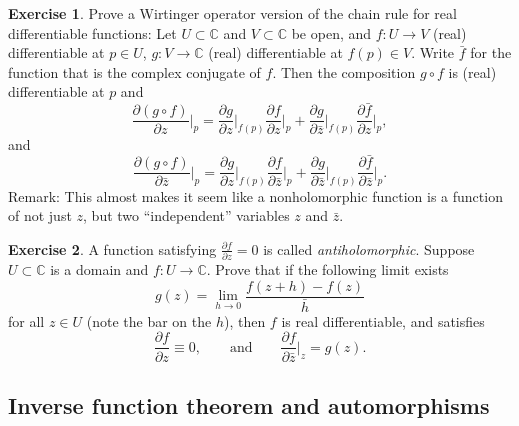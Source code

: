 \documentclass[12pt,openany]{book}
\newcommand{\C}{{\mathbb{C}}}
\newcommand{\myindex}[1]{#1\index{#1}}
\theoremstyle{plain}
\theoremstyle{remark}
\theoremstyle{definition}
\newenvironment{exbox}{%
    \def\FrameCommand{\vrule width 1pt \relax\hspace {10pt}}%
    \MakeFramed {\advance \hsize -\width \FrameRestore }%
}{%
    \endMakeFramed
}
\theoremstyle{exercise}
\newtheorem{exercise}{Exercise}[section]
\theoremstyle{example}
\begin{document}
\begin{exbox}
\begin{exercise} \label{exercise:wirtingerchain}
Prove a Wirtinger operator version of
the chain rule
for real differentiable
functions:  Let $U \subset \C$ and $V \subset \C$ be open, and $f \colon U \to V$
(real) differentiable at $p \in U$, $g \colon V \to \C$ (real) differentiable
at $f(p) \in V$.  Write $\bar{f}$ for the function that is the complex conjugate
of $f$.  Then the composition $g \circ f$
is (real) differentiable at $p$ and
\begin{equation*}
\frac{\partial (g \circ f)}{\partial z}\Big|_p
=
\frac{\partial g}{\partial z}\Big|_{f(p)}
\frac{\partial f}{\partial z}\Big|_p
+
\frac{\partial g}{\partial \bar{z}}\Big|_{f(p)}
\frac{\partial \bar{f}}{\partial z}\Big|_p ,
\end{equation*}
and
\begin{equation*}
\frac{\partial (g \circ f)}{\partial \bar{z}}\Big|_p
=
\frac{\partial g}{\partial z}\Big|_{f(p)}
\frac{\partial f}{\partial \bar{z}}\Big|_p
+
\frac{\partial g}{\partial \bar{z}}\Big|_{f(p)}
\frac{\partial \bar{f}}{\partial \bar{z}}\Big|_p .
\end{equation*}
Remark: This almost makes it seem like a nonholomorphic function is a
function of not just $z$, but two ``independent'' variables $z$ and
$\bar{z}$.
\end{exercise}

\begin{exercise}
A function satisfying $\frac{\partial f}{\partial z} = 0$ is called
\emph{\myindex{antiholomorphic}}.
Suppose $U \subset \C$ is a domain and $f \colon U \to \C$.
Prove that if the following
limit exists
\begin{equation*}
g(z) = 
\lim_{h \to 0}
\frac{f(z+h)-f(z)}{\bar{h}}
\end{equation*}
for all $z \in U$ (note the bar on the $h$), then $f$ is real differentiable, and satisfies
\begin{equation*}
\frac{\partial f}{\partial z} \equiv 0, \qquad \text{and} \qquad
\frac{\partial f}{\partial \bar{z}}\Big|_{z} = g(z).
\end{equation*}
\end{exercise}
\end{exbox}

\subsection{Inverse function theorem and automorphisms}
\end{document}

